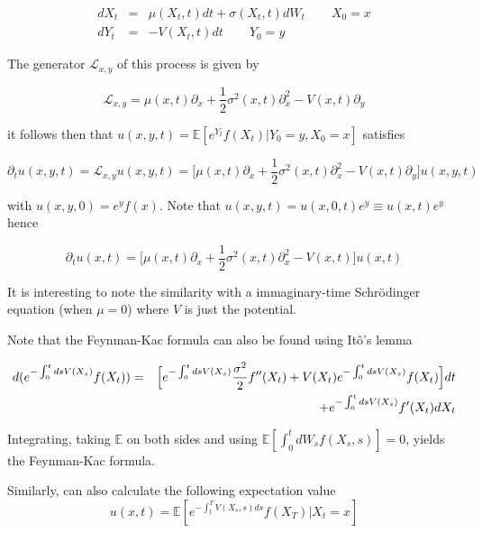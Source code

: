 \documentclass[11pt,a4paper]{article}
\begin{document}
\begin{eqnarray*}
    dX_t &=& \mu(X_t,t) dt + \sigma(X_t,t) dW_t \hspace{25pt} X_0 = x \\
    dY_t &=& -V(X_t,t)dt  \hspace{25pt} Y_0=y
\end{eqnarray*}

The generator $\mathcal{L}_{x,y}$ of this process is given by

\begin{equation}
    \mathcal{L}_{x,y} = \mu(x,t)\partial_x + \frac{1}{2}\sigma^{2}(x,t)\partial^2_x-V(x,t)\partial_y
\end{equation}

it follows then that $u(x,y,t) = \mathbb{E}[e^{Y_t}f(X_t)|Y_0 = y,X_0=x]$ satisfies

\begin{equation}
    \partial_t u(x,y,t) = \mathcal{L}_{x,y}u(x,y,t) = \Biggl[\mu(x,t)\partial_x + \frac{1}{2}\sigma^{2}(x,t)\partial^2_x-V(x,t)\partial_y\Biggl]u(x,y,t)
\end{equation}

with $u(x,y,0) = e^yf(x)$. Note that $u(x,y,t) = u(x,0,t)e^{y} \equiv u(x,t)e^y$ hence 

\begin{equation}
    \partial_t u(x,t) =  \Biggl[\mu(x,t)\partial_x + \frac{1}{2}\sigma^{2}(x,t)\partial^2_x-V(x,t)\Biggl]u(x,t)
\end{equation}

It is interesting to note the similarity with a immaginary-time Schr\"{o}dinger equation (when $\mu=0$) where $V$ is just the potential.

Note that the Feynman-Kac formula can also be found using It\^{o}'s lemma

\begin{eqnarray}
    d(e^{-\int_{0}^tdsV(X_s)}f(X_t)) &=& \Bigl[e^{-\int_{0}^tdsV(X_s)}\frac{\sigma^2}{2}f''(X_t)+V(X_t)e^{-\int_{0}^tdsV(X_s)}f(X_t)\Bigl]dt \nonumber \\
    &\phantom{=}& + e^{-\int_{0}^tdsV(X_s)}f'(X_t)dX_t
\end{eqnarray}

Integrating, taking $\mathbb{E}$ on both sides and using $\mathbb{E}[\int_{0}^t dW_s f(X_s,s)] = 0$, yields the Feynman-Kac formula.

Similarly, can also calculate the following expectation value
\begin{equation}
    u(x,t) = \mathbb{E}[e^{-\int_{t}^T V(X_s,s)ds}f(X_T)|X_t=x]
\end{equation}
\end{document}
